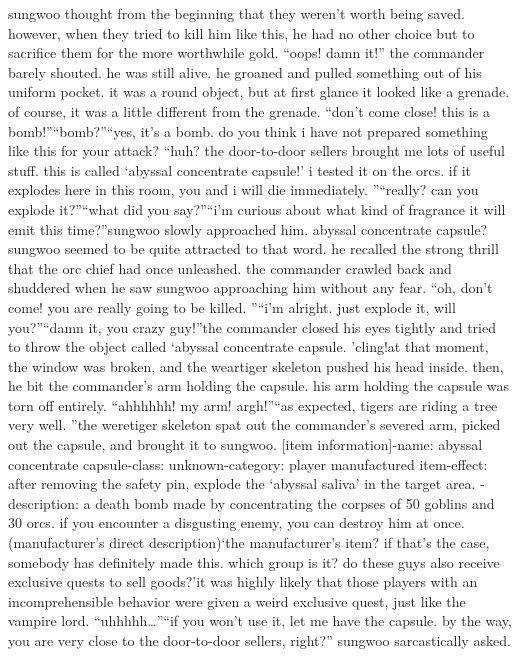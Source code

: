sungwoo thought from the beginning that they weren’t worth being saved.
 however, when they tried to kill him like this, he had no other choice but to sacrifice them for the more worthwhile gold.
“oops! damn it!” the commander barely shouted.
he was still alive.
 he groaned and pulled something out of his uniform pocket.
it was a round object, but at first glance it looked like a grenade.
 of course, it was a little different from the grenade.
“don’t come close! this is a bomb!”“bomb?”“yes, it’s a bomb.
 do you think i have not prepared something like this for your attack? “huh? the door-to-door sellers brought me lots of useful stuff.
 this is called ‘abyssal concentrate capsule!’ i tested it on the orcs.
 if it explodes here in this room, you and i will die immediately.
”“really? can you explode it?”“what did you say?”“i’m curious about what kind of fragrance it will emit this time?”sungwoo slowly approached him.
 abyssal concentrate capsule? sungwoo seemed to be quite attracted to that word.
 he recalled the strong thrill that the orc chief had once unleashed.
the commander crawled back and shuddered when he saw sungwoo approaching him without any fear.
“oh, don’t come! you are really going to be killed.
”“i’m alright.
 just explode it, will you?”“damn it, you crazy guy!”the commander closed his eyes tightly and tried to throw the object called ‘abyssal concentrate capsule.
’cling!at that moment, the window was broken, and the weartiger skeleton pushed his head inside.
 then, he bit the commander’s arm holding the capsule.
his arm holding the capsule was torn off entirely.
“ahhhhhh! my arm! argh!”“as expected, tigers are riding a tree very well.
”the weretiger skeleton spat out the commander’s severed arm, picked out the capsule, and brought it to sungwoo.
[item information]-name: abyssal concentrate capsule-class: unknown-category: player manufactured item-effect: after removing the safety pin, explode the ‘abyssal saliva’ in the target area.
-description: a death bomb made by concentrating the corpses of 50 goblins and 30 orcs.
 if you encounter a disgusting enemy, you can destroy him at once.
 (manufacturer’s direct description)‘the manufacturer’s item? if that’s the case, somebody has definitely made this.
 which group is it? do these guys also receive exclusive quests to sell goods?’it was highly likely that those players with an incomprehensible behavior were given a weird exclusive quest, just like the vampire lord.
“uhhhhh…”“if you won’t use it, let me have the capsule.
 by the way, you are very close to the door-to-door sellers, right?” sungwoo sarcastically asked.


